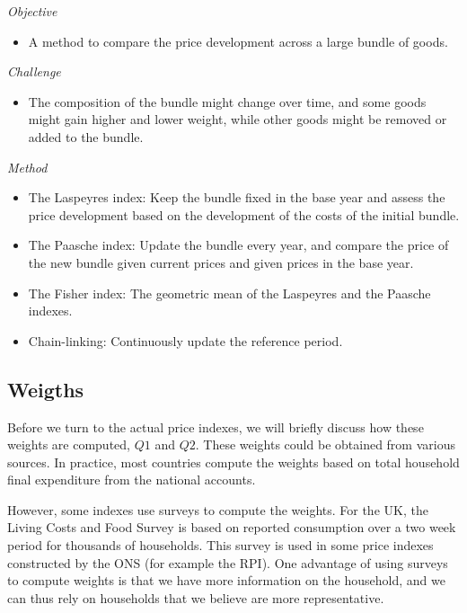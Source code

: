 \documentclass[
]{book}
\providecommand{\tightlist}{%
  \setlength{\itemsep}{0pt}\setlength{\parskip}{0pt}}
\begin{document}
\emph{Objective}

\begin{itemize}
\tightlist
\item
  A method to compare the price development across a large bundle of goods.
\end{itemize}

\emph{Challenge}

\begin{itemize}
\tightlist
\item
  The composition of the bundle might change over time, and some goods might gain higher and lower weight, while other goods might be removed or added to the bundle.
\end{itemize}

\emph{Method}

\begin{itemize}
\tightlist
\item
  The Laspeyres index: Keep the bundle fixed in the base year and assess the price development based on the development of the costs of the initial bundle.
\item
  The Paasche index: Update the bundle every year, and compare the price of the new bundle given current prices and given prices in the base year.
\item
  The Fisher index: The geometric mean of the Laspeyres and the Paasche indexes.
\item
  Chain-linking: Continuously update the reference period.
\end{itemize}

\hypertarget{weigths}{%
\subsection*{Weigths}\label{weigths}}

Before we turn to the actual price indexes, we will briefly discuss how these weights are computed, \(Q1\) and \(Q2\). These weights could be obtained from various sources. In practice, most countries compute the weights based on total household final expenditure from the national accounts.

However, some indexes use surveys to compute the weights. For the UK, the Living Costs and Food Survey is based on reported consumption over a two week period for thousands of households. This survey is used in some price indexes constructed by the ONS (for example the RPI). One advantage of using surveys to compute weights is that we have more information on the household, and we can thus rely on households that we believe are more representative.
\end{document}
